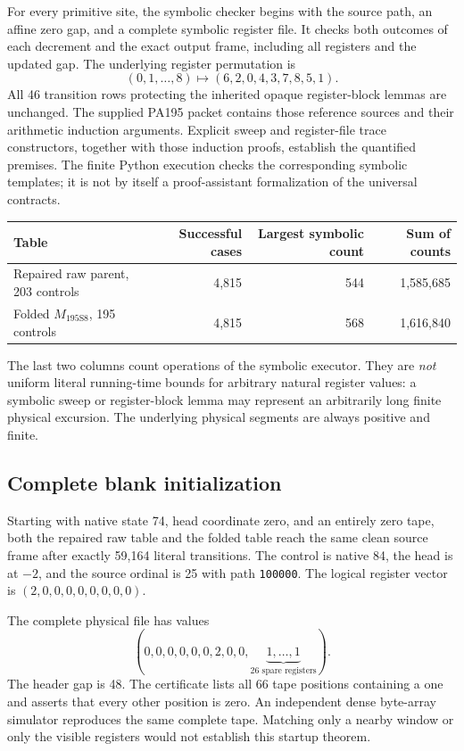 \documentclass[11pt,letterpaper]{article}
\newcommand{\Mnew}{M_{\mathrm{195S8}}}
\begin{document}
For every primitive site, the symbolic checker begins with the source
path, an affine zero gap, and a complete symbolic register file.
It checks both outcomes of each decrement and the exact output frame,
including all registers and the updated gap.
The underlying register permutation is
\[
(0,1,\ldots,8)\longmapsto(6,2,0,4,3,7,8,5,1).
\]
All 46 transition rows protecting the inherited opaque register-block
lemmas are unchanged. The supplied PA195 packet contains those reference
sources and their arithmetic induction arguments. Explicit sweep and
register-file trace constructors, together with those induction proofs,
establish the quantified premises. The finite Python execution checks
the corresponding symbolic templates; it is not by itself a
proof-assistant formalization of the universal contracts.

\begin{center}
\begin{tabular}{@{}lrrr@{}}
\toprule
Table & Successful cases & Largest symbolic count & Sum of counts\\
\midrule
Repaired raw parent, 203 controls &4,815&544&1,585,685\\
Folded $\Mnew$, 195 controls &4,815&568&1,616,840\\
\bottomrule
\end{tabular}
\end{center}
The last two columns count operations of the symbolic executor.
They are \emph{not} uniform literal running-time bounds for arbitrary
natural register values: a symbolic sweep or register-block lemma may
represent an arbitrarily long finite physical excursion.
The underlying physical segments are always positive and finite.

\subsection{Complete blank initialization}
Starting with native state 74, head coordinate zero, and an entirely
zero tape, both the repaired raw table and the folded table reach the
same clean source frame after exactly 59,164 literal transitions.
The control is native 84, the head is at $-2$, and the source ordinal
is 25 with path \texttt{100000}. The logical register vector is
$(2,0,0,0,0,0,0,0,0)$.

The complete physical file has values
\[
(0,0,0,0,0,0,2,0,0,
\underbrace{1,\ldots,1}_{26\text{ spare registers}}).
\]
The header gap is 48. The certificate lists all 66 tape positions
containing a one and asserts that every other position is zero.
An independent dense byte-array simulator reproduces the same complete
tape. Matching only a nearby window or only the visible registers
would not establish this startup theorem.
\end{document}
